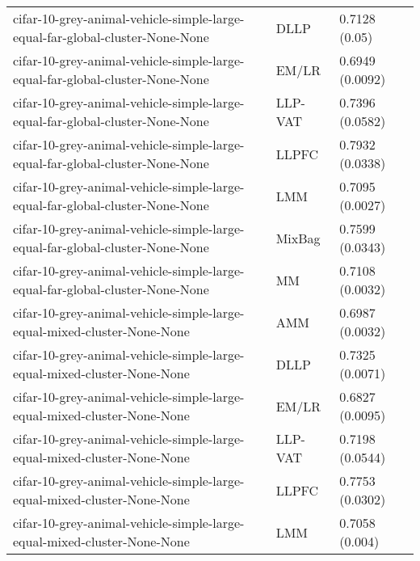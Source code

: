 \begin{longtable}{lll}
                                 cifar-10-grey-animal-vehicle-simple-large-equal-far-global-cluster-None-None &      DLLP &                         0.7128 (0.05) \\
                                 cifar-10-grey-animal-vehicle-simple-large-equal-far-global-cluster-None-None &     EM/LR &                       0.6949 (0.0092) \\
                                 cifar-10-grey-animal-vehicle-simple-large-equal-far-global-cluster-None-None &   LLP-VAT &                       0.7396 (0.0582) \\
                                 cifar-10-grey-animal-vehicle-simple-large-equal-far-global-cluster-None-None &     LLPFC &                       0.7932 (0.0338) \\
                                 cifar-10-grey-animal-vehicle-simple-large-equal-far-global-cluster-None-None &       LMM &                       0.7095 (0.0027) \\
                                 cifar-10-grey-animal-vehicle-simple-large-equal-far-global-cluster-None-None &    MixBag &                       0.7599 (0.0343) \\
                                 cifar-10-grey-animal-vehicle-simple-large-equal-far-global-cluster-None-None &        MM &                       0.7108 (0.0032) \\
                                      cifar-10-grey-animal-vehicle-simple-large-equal-mixed-cluster-None-None &       AMM &                       0.6987 (0.0032) \\
                                      cifar-10-grey-animal-vehicle-simple-large-equal-mixed-cluster-None-None &      DLLP &                       0.7325 (0.0071) \\
                                      cifar-10-grey-animal-vehicle-simple-large-equal-mixed-cluster-None-None &     EM/LR &                       0.6827 (0.0095) \\
                                      cifar-10-grey-animal-vehicle-simple-large-equal-mixed-cluster-None-None &   LLP-VAT &                       0.7198 (0.0544) \\
                                      cifar-10-grey-animal-vehicle-simple-large-equal-mixed-cluster-None-None &     LLPFC &                       0.7753 (0.0302) \\
                                      cifar-10-grey-animal-vehicle-simple-large-equal-mixed-cluster-None-None &       LMM &                        0.7058 (0.004) \\

\end{longtable}
